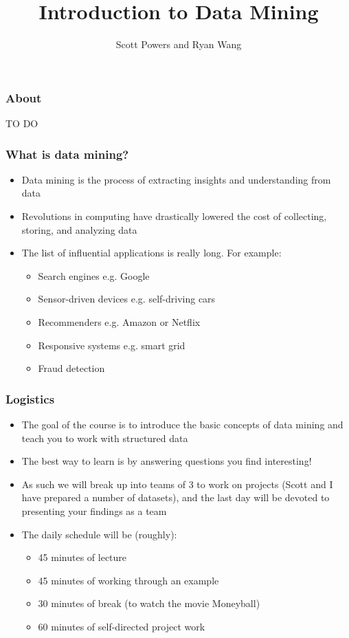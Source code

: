 \documentclass{beamer}
\title{Introduction to Data Mining}
\author{Scott Powers and Ryan Wang}
\begin{document}
\begin{frame}
\titlepage
\end{frame}


\begin{frame}
\frametitle{About}
TO DO
\end{frame}

\begin{frame}
\frametitle{What is data mining?}
\begin{itemize}
	\item Data mining is the process of extracting insights and understanding from data
	\item Revolutions in computing have drastically lowered the cost of collecting, storing, and analyzing data
	\item The list of influential applications is really long. For example:
	\begin{itemize}
		\item Search engines e.g. Google
		\item Sensor-driven devices e.g. self-driving cars
		\item Recommenders e.g. Amazon or Netflix
		\item Responsive systems e.g. smart grid
		\item Fraud detection
	\end{itemize}
\end{itemize}
\end{frame}

\begin{frame}
\frametitle{Logistics}
\begin{itemize}
	\item The goal of the course is to introduce the basic concepts of data mining and teach you to work with structured data
	\item The best way to learn is by answering questions you find interesting! 
	\item As such we will break up into teams of 3 to work on projects (Scott and I have prepared a number of datasets), and the last day will be devoted to presenting your findings as a team
	\item The daily schedule will be (roughly):
	\begin{itemize}
		\item 45 minutes of lecture
		\item 45 minutes of working through an example
		\item 30 minutes of break (to watch the movie Moneyball)
		\item 60 minutes of self-directed project work
	\end{itemize}
\end{itemize}
\end{frame}
\end{document}
